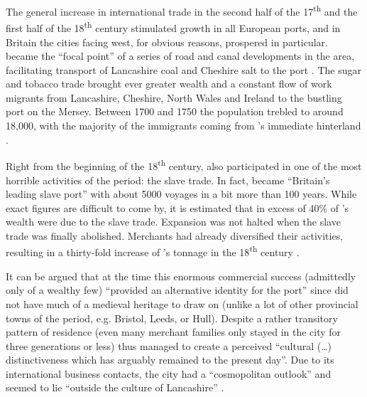 The general increase in international trade in the second half of the 17\textsuperscript{th} and the first half of the 18\textsuperscript{th} century stimulated growth in all European ports, and in Britain the cities facing west, for obvious reasons, prospered in particular.
 became the ``focal point'' of a series of road and canal developments in the area, facilitating transport of Lancashire coal and Cheshire salt to the port \citep[129]{longmore2006}.
The sugar and tobacco trade brought ever greater wealth and a constant flow of work migrants from Lancashire, Cheshire, North Wales and Ireland to the bustling port on the Mersey.
Between 1700 and 1750 the population trebled to around 18,000, with the majority of the immigrants coming from 's immediate hinterland \citep[cf.][114--119 and 169]{longmore2006}.

Right from the beginning of the 18\textsuperscript{th} century,  also participated in one of the most horrible activities of the period: the slave trade.
In fact,  became ``Britain's leading slave port'' with about 5000 voyages in a bit more than 100 years.
While exact figures are difficult to come by, it is estimated that in excess of 40\% of 's wealth were due to the slave trade.
Expansion was not halted when the slave trade was finally abolished.
Merchants had already diversified their activities, resulting in a thirty-fold increase of 's tonnage in the 18\textsuperscript{th} century \citep[cf.][131--134 and 137]{longmore2006}.

It can be argued that at the time this enormous commercial success (admittedly only of a wealthy few) ``provided an alternative identity for the port'' since  did not have much of a medieval heritage to draw on (unlike a lot of other provincial towns of the period, e.g. Bristol, Leeds, or Hull).
Despite a rather transitory pattern of residence (even many merchant families only stayed in the city for three generations or less)  thus managed to create a perceived ``cultural (\ldots) distinctiveness which has arguably remained to the present day''. Due to its international business contacts, the city had a ``cosmopolitan outlook'' and seemed to lie ``outside the culture of Lancashire'' \citep[152--154]{longmore2006}.

